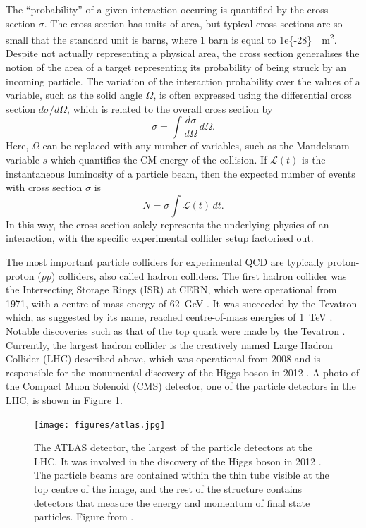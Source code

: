\documentclass[12pt,a4paper]{report}
\begin{document}
The ``probability'' of a given interaction occuring is quantified by the cross section $\sigma$. The cross section has units of area, but typical cross sections are so small that the standard unit is barns, where 1 barn is equal to \qty{1e{-28}}{\per\square\meter}. Despite not actually representing a physical area, the cross section generalises the notion of the area of a target representing its probability of being struck by an incoming particle. The variation of the interaction probability over the values of a variable, such as the solid angle $\Omega$, is often expressed using the differential cross section $d\sigma / d\Omega$, which is related to the overall cross section by
\begin{equation}
  \sigma = \int \frac{d\sigma}{d\Omega} \, d\Omega.
\end{equation}
Here, $\Omega$ can be replaced with any number of variables, such as the Mandelstam variable $s$ which quantifies the CM energy of the collision. If $\mathcal{L}(t)$ is the instantaneous luminosity of a particle beam, then the expected number of events with cross section $\sigma$ is
\begin{equation}
  N = \sigma \int \mathcal{L}(t) \, dt.
\end{equation}
In this way, the cross section solely represents the underlying physics of an interaction, with the specific experimental collider setup factorised out.

The most important particle colliders for experimental QCD are typically proton-proton ($pp$) colliders, also called hadron colliders. The first hadron collider was the Intersecting Storage Rings (ISR) at CERN, which were operational from 1971, with a centre-of-mass energy of \qty{62}{\giga\electronvolt} \cite{Hubner:2012td,Erhan:1979ba,ParticleDataGroup:2024cfk}. It was succeeded by the Tevatron which, as suggested by its name, reached centre-of-mass energies of \qty{1}{\tera\electronvolt} \cite{TeVIGroup:1984ewd}. Notable discoveries such as that of the top quark were made by the Tevatron \cite{D0:1995jca,CDF:1995wbb}. Currently, the largest hadron collider is the creatively named Large Hadron Collider (LHC) described above, which was operational from 2008 and is responsible for the monumental discovery of the Higgs boson in 2012 \cite{Evans:2008zzb,ATLAS:2012yve,CMS:2012qbp}. A photo of the Compact Muon Solenoid (CMS) detector, one of the particle detectors in the LHC, is shown in Figure \ref{fig:atlas}.

\begin{figure}
  \centering
  \texttt{[image: figures/atlas.jpg]}
  \caption{The ATLAS detector, the largest of the particle detectors at the LHC. It was involved in the discovery of the Higgs boson in 2012 \cite{ATLAS:2012yve}. The particle beams are contained within the thin tube visible at the top centre of the image, and the rest of the structure contains detectors that measure the energy and momentum of final state particles. Figure from \cite{ATLASimage}.}
  \label{fig:atlas}
\end{figure}
\end{document}
